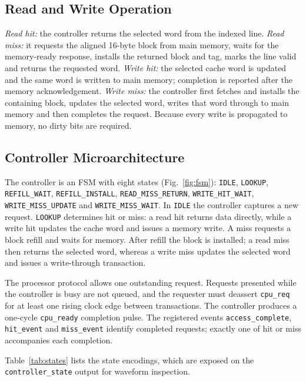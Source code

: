 \documentclass[conference,a4paper]{IEEEtran}
\begin{document}
\subsection{Read and Write Operation}\label{sec:rw}
\emph{Read hit:} the controller returns the selected word from the indexed line. \emph{Read miss:} it requests the aligned 16-byte block from main memory, waits for the memory-ready response, installs the returned block and tag, marks the line valid and returns the requested word. \emph{Write hit:} the selected cache word is updated and the same word is written to main memory; completion is reported after the memory acknowledgement. \emph{Write miss:} the controller first fetches and installs the containing block, updates the selected word, writes that word through to main memory and then completes the request. Because every write is propagated to memory, no dirty bits are required.

\subsection{Controller Microarchitecture}\label{sec:fsm}
The controller is an FSM with eight states (Fig.~\ref{fig:fsm}): \texttt{IDLE}, \texttt{LOOKUP}, \texttt{REFILL\_WAIT}, \texttt{REFILL\_INSTALL}, \texttt{READ\_MISS\_RETURN}, \texttt{WRITE\_HIT\_WAIT}, \texttt{WRITE\_MISS\_UPDATE} and \texttt{WRITE\_MISS\_WAIT}. In \texttt{IDLE} the controller captures a new request. \texttt{LOOKUP} determines hit or miss: a read hit returns data directly, while a write hit updates the cache word and issues a memory write. A miss requests a block refill and waits for memory. After refill the block is installed; a read miss then returns the selected word, whereas a write miss updates the selected word and issues a write-through transaction.

The processor protocol allows one outstanding request. Requests presented while the controller is busy are not queued, and the requester must deassert \texttt{cpu\_req} for at least one rising clock edge between transactions. The controller produces a one-cycle \texttt{cpu\_ready} completion pulse. The registered events \texttt{access\_complete}, \texttt{hit\_event} and \texttt{miss\_event} identify completed requests; exactly one of hit or miss accompanies each completion.

Table~\ref{tab:states} lists the state encodings, which are exposed on the \texttt{controller\_state} output for waveform inspection.
\end{document}
